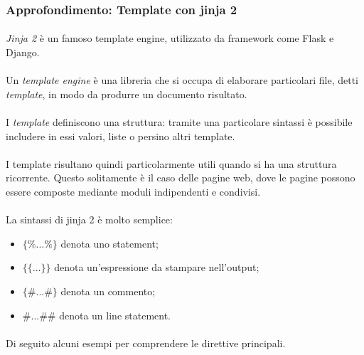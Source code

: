 \documentclass[11pt,a4paper,english]{article}
\begin{document}
\subsubsection{Approfondimento: Template con jinja 2}

\paragraph{} \emph{Jinja 2} \cite{jinja} è un famoso template engine, utilizzato da framework come Flask e Django.

\paragraph{} Un \emph{template engine} è una libreria che si occupa di elaborare particolari file, detti \emph{template}, in modo da produrre un documento risultato. 

\paragraph{} I \emph{template} definiscono una struttura: tramite una particolare sintassi è possibile includere in essi valori, liste o persino altri template. 

\paragraph{} I template risultano quindi particolarmente utili quando si ha una struttura ricorrente. Questo solitamente è il caso delle pagine web, dove le pagine possono essere composte mediante moduli indipendenti e condivisi.

\paragraph{} La sintassi di jinja 2 è molto semplice:
\begin{itemize}
    \item $\{\% ... \%\}$ denota uno statement;
    \item $\{\{ ... \}\}$ denota un'espressione da stampare nell'output;
    \item $\{\# ... \#\}$ denota un commento;
    \item $\# ... \#\#$ denota un line statement.
\end{itemize}

\paragraph{} Di seguito alcuni esempi per comprendere le direttive principali.
\end{document}
